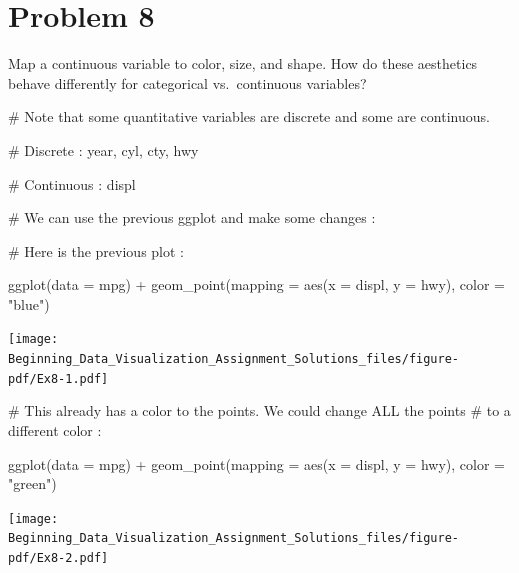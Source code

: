 \documentclass[
  letterpaper,
  DIV=11,
  numbers=noendperiod]{scrreprt}
\newenvironment{Shaded}{\begin{snugshade}}{\end{snugshade}}
\newcommand{\AttributeTok}[1]{\textcolor[rgb]{0.40,0.45,0.13}{#1}}
\newcommand{\CommentTok}[1]{\textcolor[rgb]{0.37,0.37,0.37}{#1}}
\newcommand{\FunctionTok}[1]{\textcolor[rgb]{0.28,0.35,0.67}{#1}}
\newcommand{\NormalTok}[1]{\textcolor[rgb]{0.00,0.23,0.31}{#1}}
\newcommand{\SpecialCharTok}[1]{\textcolor[rgb]{0.37,0.37,0.37}{#1}}
\newcommand{\StringTok}[1]{\textcolor[rgb]{0.13,0.47,0.30}{#1}}
\begin{document}
\section*{Problem 8}\label{problem-8-3}


Map a continuous variable to color, size, and shape. How do these
aesthetics behave differently for categorical vs.~continuous variables?

\begin{Shaded}
\begin{Highlighting}[]
\CommentTok{\# Note that some quantitative variables are discrete and some are continuous.}

\CommentTok{\# Discrete : year, cyl, cty, hwy}

\CommentTok{\# Continuous : displ}

\CommentTok{\# We can use the previous ggplot and make some changes :}

\CommentTok{\# Here is the previous plot : }

\FunctionTok{ggplot}\NormalTok{(}\AttributeTok{data =}\NormalTok{ mpg) }\SpecialCharTok{+} 
  \FunctionTok{geom\_point}\NormalTok{(}\AttributeTok{mapping =} \FunctionTok{aes}\NormalTok{(}\AttributeTok{x =}\NormalTok{ displ, }\AttributeTok{y =}\NormalTok{ hwy), }\AttributeTok{color =} \StringTok{"blue"}\NormalTok{)}
\end{Highlighting}
\end{Shaded}

\texttt{[image: Beginning\_Data\_Visualization\_Assignment\_Solutions\_files/figure-pdf/Ex8-1.pdf]}

\begin{Shaded}
\begin{Highlighting}[]
\CommentTok{\# This already has a color to the points. We could change ALL the points}
\CommentTok{\# to a different color :}

\FunctionTok{ggplot}\NormalTok{(}\AttributeTok{data =}\NormalTok{ mpg) }\SpecialCharTok{+} 
  \FunctionTok{geom\_point}\NormalTok{(}\AttributeTok{mapping =} \FunctionTok{aes}\NormalTok{(}\AttributeTok{x =}\NormalTok{ displ, }\AttributeTok{y =}\NormalTok{ hwy), }\AttributeTok{color =} \StringTok{"green"}\NormalTok{)}
\end{Highlighting}
\end{Shaded}

\texttt{[image: Beginning\_Data\_Visualization\_Assignment\_Solutions\_files/figure-pdf/Ex8-2.pdf]}
\end{document}
